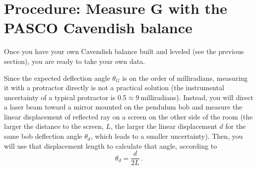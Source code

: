 \section{Procedure: Measure $\bm{G}$ with the PASCO Cavendish balance}

Once you have your own Cavendish balance built and leveled (see the previous section), you are ready to take your own data.

Since the expected deflection angle $\theta_G$ is on the order of milliradians, measuring it with a protractor directly is not a practical solution (the instrumental uncertainty of a typical protractor is 0.5\textdegree$\approx 9\:$milliradians). Instead, you will direct a laser beam toward a mirror mounted on the pendulum bob and measure the linear displacement of reflected ray on a screen on the other side of the room (the larger the distance to the screen, $L$, the larger the linear displacement $d$ for the same bob deflection angle $\theta_d$, which leads to a smaller uncertainty). Then, you will use that displacement length to calculate that angle, according to
\begin{equation}\label{cav:eq:displacement}
 \theta_d = \frac{d}{2 L} \,.
\end{equation}

